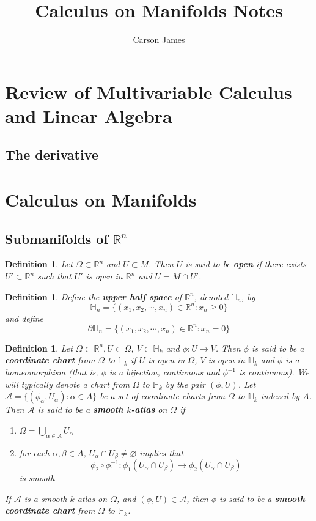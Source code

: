 \documentclass[12pt]{amsart}
\newtheorem{defn}[thm]{Definition}
\newcommand{\al}{\alpha}
\newcommand{\Om}{\Omega}
\renewcommand{\H}{\mathbb{H}}
\newcommand{\R}{\mathbb{R}}
\newcommand{\MA}{\mathcal{A}}
\begin{document}
	
	\title{Calculus on Manifolds Notes}
	\author{Carson James}
	\maketitle
	
	\tableofcontents
	
	\section{Review of Multivariable Calculus and Linear Algebra}
	
	\subsection{The derivative}


	
	\section{Calculus on Manifolds}
	
	\subsection{Submanifolds of $\R^n$}
	
	\begin{defn}
		Let $\Om \subset \R^n$ and $U \subset M$. Then $U$ is said to be \textbf{open} if there exists $U' \subset \R^n$ such that $U'$ is open in $\R^n$ and $U = M \cap U'$.
	\end{defn}
	
	\begin{defn}
		Define the \textbf{upper half space} of $\R^n$, denoted $\H_n$, by $$\H_n = \{(x_1, x_2, \cdots, x_n) \in \R^n: x_n \geq 0\}$$ and define $$\partial\H_n = \{(x_1, x_2, \cdots, x_n) \in \R^n: x_n = 0\}$$ 
	\end{defn}

	\begin{defn}
		Let $\Om \subset \R^n, U \subset \Om$, $V \subset \H_k$ and $\phi:U \rightarrow V$. Then $\phi$ is said to be a \textbf{coordinate chart} from $\Om$ to $\H_k$ if $U$ is open in $\Om$, $V$ is open in $\H_k$ and $\phi$ is a homeomorphism (that is, $\phi$ is a bijection, continuous and $\phi^{-1}$ is continuous). We will typically denote a chart from $\Om$ to $\H_k$ by the pair $(\phi, U)$. Let $\MA = \{(\phi_{\al}, U_{\al}): \al \in A\}$ be a set of coordinate charts from $\Om$ to $\H_k$ indexed by $A$. Then $\MA$ is said to be a \textbf{smooth $k$-atlas} on $\Om$ if 
		\begin{enumerate}
			\item $\Om = \bigcup\limits_{\al \in A} U_{\al}$
			\item for each $\al, \beta \in A$, $U_{\al} \cap U_{\beta} \neq \varnothing$ implies that $$\phi_2 \circ \phi_1^{-1}: \phi_1(U_{\al} \cap U_{\beta}) \rightarrow \phi_2(U_{\al} \cap U_{\beta})$$ is  smooth
		\end{enumerate} 
	If $\MA$ is a smooth $k$-atlas on $\Om$, and $(\phi, U) \in \MA$, then $\phi$ is said to be a \textbf{smooth coordinate chart} from $\Om$ to $\H_k$. 
	\end{defn}
\end{document}
